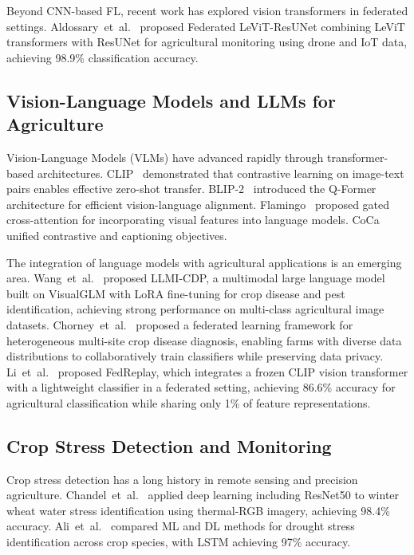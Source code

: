 \documentclass[conference]{IEEEtran}
\begin{document}
Beyond CNN-based FL, recent work has explored vision transformers in federated settings.
Aldossary~et~al.~\cite{Aldossary2025} proposed Federated LeViT-ResUNet combining LeViT
transformers with ResUNet for agricultural monitoring using drone and IoT data, achieving
98.9\% classification accuracy.

\subsection{Vision-Language Models and LLMs for Agriculture}

Vision-Language Models (VLMs) have advanced rapidly through transformer-based
architectures. CLIP~\cite{Radford2021} demonstrated that contrastive learning on
image-text pairs enables effective zero-shot transfer. BLIP-2~\cite{Li2023} introduced
the Q-Former architecture for efficient vision-language alignment. Flamingo~\cite{Alayrac2022}
proposed gated cross-attention for incorporating visual features into language models.
CoCa~\cite{Yu2022} unified contrastive and captioning objectives.

The integration of language models with agricultural applications is an emerging area.
Wang~et~al.~\cite{Long2025} proposed LLMI-CDP, a multimodal large language model
built on VisualGLM with LoRA fine-tuning for crop disease and pest identification,
achieving strong performance on multi-class agricultural image datasets. Chorney~et~al.~\cite{Xu2025} proposed a federated learning framework for
heterogeneous multi-site crop disease diagnosis, enabling farms with diverse
data distributions to collaboratively train classifiers while preserving data privacy. Li~et~al.~\cite{Li2025} proposed FedReplay, which integrates a frozen CLIP
vision transformer with a lightweight classifier in a federated setting, achieving 86.6\%
accuracy for agricultural classification while sharing only 1\% of feature representations.

\subsection{Crop Stress Detection and Monitoring}

Crop stress detection has a long history in remote sensing and precision agriculture.
Chandel~et~al.~\cite{Chandel2022} applied deep learning including ResNet50 to winter wheat
water stress identification using thermal-RGB imagery, achieving 98.4\% accuracy.
Ali~et~al.~\cite{Ali2024} compared ML and DL methods for drought stress identification
across crop species, with LSTM achieving 97\% accuracy.
\end{document}
